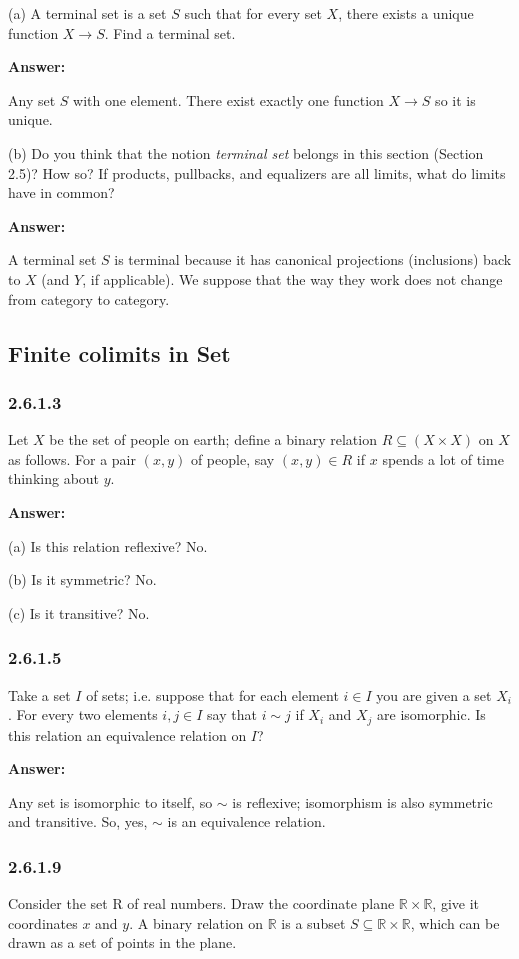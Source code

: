 \documentclass{article}
\newcommand{\Rational}{\mathbb{R}}
\newcommand{\vsp}[0]{\vspace*{10pt}\par}
\newcommand{\exercise}[1]{\subsubsection*{#1}}
\newcommand{\ans}[0]{\vsp\textbf{Answer: }\vsp}
\begin{document}
(a) A terminal set is a set $S$ such that for every set $X$, there exists a
unique function $X \to S$. Find a terminal set.

\ans

Any set $S$ with one element. There exist exactly one function $X \to S$ so it
is unique.

\vsp

(b) Do you think that the notion \textit{terminal set} belongs in this section (Section
2.5)? How so?  If products, pullbacks, and equalizers are all limits, what do
limits have in common?

\ans

A terminal set $S$ is terminal because it has canonical projections
(inclusions) back to $X$ (and $Y$, if applicable). We suppose that the way they
work does not change from category to category.


\subsection{Finite colimits in Set}

\exercise{2.6.1.3}

Let $X$ be the set of people on earth; define a binary relation $R \subseteq (X
\times X)$ on $X$ as follows. For a pair $(x, y)$ of people, say $(x, y) \in R$
if $x$ spends a lot of time thinking about $y$.
\ans
(a) Is this relation reflexive? No.

(b) Is it symmetric? No.

(c) Is it transitive? No.

\exercise{2.6.1.5}

Take a set $I$ of sets; i.e. suppose that for each element $i \in I$ you are
given a set $X_i$. For every two elements $i,j \in I$ say that $i \sim j$ if
$X_i$ and $X_j$ are isomorphic. Is this relation an equivalence relation on
$I$?

\ans

Any set is isomorphic to itself, so $\sim$ is reflexive; isomorphism is also
symmetric and transitive. So, yes, $\sim$ is an equivalence relation.

\exercise{2.6.1.9}

Consider the set R of real numbers. Draw the coordinate plane $\Rational
\times \Rational$, give it coordinates $x$ and $y$. A binary relation on
$\Rational$ is a subset $S \subseteq \Rational \times \Rational$, which can
be drawn as a set of points in the plane.

\vsp
\end{document}
